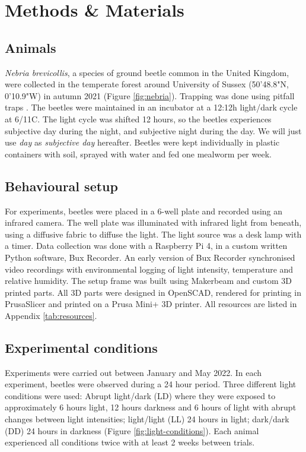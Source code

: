 \section{Methods \& Materials} \label{methods}
\subsection{Animals}
\textit{Nebria brevicollis}, a species of ground beetle common in the United Kingdom, were collected in the temperate forest around University of Sussex (50'48.8"N, 0'10.9"W) in autumn 2021 (Figure \ref{fig:nebria}). Trapping was done using pitfall traps \citep{Homburg2019}. The beetles were maintained in an incubator at a 12:12h light/dark cycle at 6\degree /11\degree C. The light cycle was shifted 12 hours, so the beetles experiences subjective day during the night, and subjective night during the day. We will just use \textit{day} as \textit{subjective day} hereafter. Beetles were kept individually in plastic containers with soil, sprayed with water and fed one mealworm per week.


\subsection{Behavioural setup}
For experiments, beetles were placed in a 6-well plate and recorded using an infrared camera. The well plate was illuminated with infrared light from beneath, using a diffusive fabric to diffuse the light. The light source was a desk lamp with a timer. Data collection was done with a Raspberry Pi 4, in a custom written Python software, Bux Recorder. An early version of Bux Recorder synchronised video recordings with environmental logging of light intensity, temperature and relative humidity. The setup frame was built using Makerbeam and custom 3D printed parts. All 3D parts were designed in OpenSCAD, rendered for printing in PrusaSlicer and printed on a Prusa Mini+ 3D printer. All resources are listed in Appendix \ref{tab:resources}.

\subsection{Experimental conditions}
Experiments were carried out between January and May 2022. In each experiment, beetles were observed during a 24 hour period. Three different light conditions were used: Abrupt light/dark (LD) where they were exposed to approximately 6 hours light, 12 hours darkness and 6 hours of light with abrupt changes between light intensities; light/light (LL) 24 hours in light; dark/dark (DD) 24 hours in darkness (Figure \ref{fig:light-conditions}). Each animal experienced all conditions twice with at least 2 weeks between trials.

